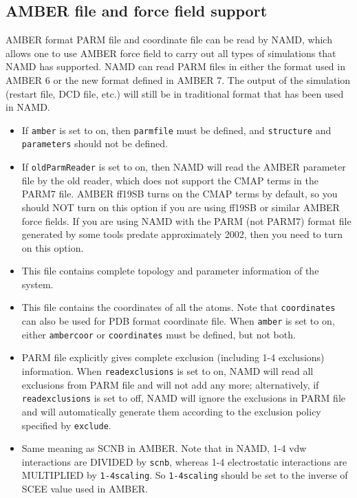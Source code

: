 \subsection{AMBER file and force field support}

AMBER format PARM file and coordinate file can be read by NAMD,
which allows one to use AMBER force field to carry out all types
of simulations that NAMD has supported. NAMD can read PARM files
in either the format used in AMBER 6 or the new format
defined in AMBER 7. The output of
the simulation (restart file, DCD file, etc.) will still be in
traditional format that has been used in NAMD.

\begin{itemize}

\item
{}
{
If {\tt amber} is set to on, then {\tt parmfile} must be defined,
and {\tt structure} and {\tt parameters} should not be defined.
}

\item
{}
{
If {\tt oldParmReader} is set to on, then NAMD will read the AMBER parameter 
file by the old reader, which does not support the CMAP terms in the PARM7 
file. AMBER ff19SB turns on the CMAP terms by default, so you should NOT turn 
on this option if you are using ff19SB or similar AMBER force fields. If you 
are using NAMD with the PARM (not PARM7) format file generated by some tools 
predate approximately 2002, then you need to turn on this option. 
}

\item
{}
{
This file contains complete topology and parameter information of
the system.
}

\item
{}
{
This file contains the coordinates of all the atoms. Note that
{\tt coordinates} can also be used for PDB format coordinate
file. When {\tt amber} is set to on, either {\tt ambercoor}
or {\tt coordinates} must be defined, but not both.
}

\item
{}
{
PARM file explicitly gives complete exclusion (including 1-4
exclusions) information. When {\tt readexclusions} is set to on,
NAMD will read all exclusions from PARM file and will not add any
more; alternatively, if {\tt readexclusions} is set to
off, NAMD will ignore the exclusions in PARM file and will
automatically generate them according to the
exclusion policy specified by {\tt exclude}.
}

\item
{}
{
Same meaning as SCNB in AMBER. Note that in NAMD, 1-4 vdw
interactions are DIVIDED by {\tt scnb}, whereas 1-4 electrostatic
interactions are MULTIPLIED by {\tt 1-4scaling}. So
{\tt 1-4scaling} should be set to the inverse of SCEE value used
in AMBER.
}

\end{itemize}

